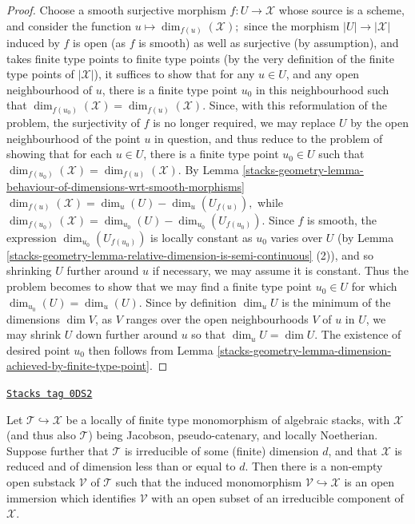 \begin{proof}
Choose a smooth surjective
morphism  $f:U \to \mathcal{X}$ whose source is a scheme, and consider the
function $u \mapsto \dim_{f(u)}(\mathcal{X});$
since the morphism $|U| \to |\mathcal{X}|$ induced by $f$ is open (as $f$
is smooth) as well as  surjective (by assumption),
and takes finite type points to finite type points (by the very definition
of the finite type points of $|\mathcal{X}|$),
it suffices to show that for any $u \in U$, and any open neighbourhood of $u$,
there is a finite type point $u_0$ in this neighbourhood such that
$\dim_{f(u_0)}(\mathcal{X}) = \dim_{f(u)}(\mathcal{X}).$
Since, with this reformulation
of the problem,  the surjectivity of $f$ is no longer required,
we may replace $U$ by the open neighbourhood of the point $u$ in question,
and thus reduce to the problem of showing that for each $u \in U$,
there is a finite type point $u_0 \in U$ such that
$\dim_{f(u_0)}(\mathcal{X}) = \dim_{f(u)}(\mathcal{X}).$
By Lemma \ref{stacks-geometry-lemma-behaviour-of-dimensions-wrt-smooth-morphisms}
$\dim_{f(u)}(\mathcal{X}) = \dim_u(U) - \dim_u(U_{f(u)}),$
while
$\dim_{f(u_0)}(\mathcal{X}) = \dim_{u_0}(U) - \dim_{u_0}(U_{f(u_0)}).$
Since $f$ is smooth, the expression $\dim_{u_0}(U_{f(u_0)})$ is locally
constant as $u_0$ varies over $U$ (by
Lemma \ref{stacks-geometry-lemma-relative-dimension-is-semi-continuous} (2)),
and so shrinking $U$ further around
$u$ if necessary, we may assume it is constant.  Thus the problem
becomes to show that we may find a finite type point $u_0 \in U$
for which $\dim_{u_0}(U) = \dim_u(U)$.
Since by definition $\dim_u U$ is the minimum of the dimensions
$\dim V$, as $V$ ranges over the open neighbourhoods $V$ of $u$
in $U$, we may shrink $U$ down further around $u$ so that
$\dim_u U = \dim U$.
The existence of desired point $u_0$ then follows from
Lemma \ref{stacks-geometry-lemma-dimension-achieved-by-finite-type-point}.
\end{proof}

\begin{lemma}
\label{stacks-geometry-lemma-monomorphing-a-component-in-of-the-right-dimension}
\href{https://stacks.math.columbia.edu/tag/0DS2}{\texttt{Stacks tag 0DS2}}

Let $\mathcal{T} \hookrightarrow \mathcal{X}$ be a locally
of finite type monomorphism of algebraic stacks,
with $\mathcal{X}$ (and thus also $\mathcal{T}$)
being Jacobson, pseudo-catenary, and locally Noetherian.
Suppose further that $\mathcal{T}$ is irreducible
of some (finite) dimension $d$, and that $\mathcal{X}$ is reduced
and of dimension less
than or equal to $d$.
Then there is a non-empty open substack $\mathcal{V}$ of $\mathcal{T}$ such
that the induced
monomorphism $\mathcal{V} \hookrightarrow \mathcal{X}$ is an open immersion
which identifies
$\mathcal{V}$ with an open subset of an irreducible component of $\mathcal{X}$.
\end{lemma}

